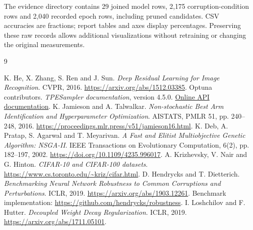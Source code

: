 \documentclass[11pt,a4paper,oneside]{report}
\begin{document}
The evidence directory contains 29 joined model rows, 2,175 corruption-condition rows and 2,040 recorded epoch rows, including pruned candidates. CSV accuracies are fractions; report tables and axes display percentages. Preserving these raw records allows additional visualizations without retraining or changing the original measurements.
\clearpage
\begin{thebibliography}{9}
{}
 K. He, X. Zhang, S. Ren and J. Sun. \emph{Deep Residual Learning for Image Recognition}. CVPR, 2016. \url{https://arxiv.org/abs/1512.03385}.
 Optuna contributors. \emph{TPESampler documentation}, version 4.5.0. \href{https://optuna.readthedocs.io/en/v4.5.0/reference/samplers/generated/optuna.samplers.TPESampler.html}{Online API documentation}.
 K. Jamieson and A. Talwalkar. \emph{Non-stochastic Best Arm Identification and Hyperparameter Optimization}. AISTATS, PMLR 51, pp. 240--248, 2016. \url{https://proceedings.mlr.press/v51/jamieson16.html}.
 K. Deb, A. Pratap, S. Agarwal and T. Meyarivan. \emph{A Fast and Elitist Multiobjective Genetic Algorithm: NSGA-II}. IEEE Transactions on Evolutionary Computation, 6(2), pp. 182--197, 2002. \url{https://doi.org/10.1109/4235.996017}.
 A. Krizhevsky, V. Nair and G. Hinton. \emph{CIFAR-10 and CIFAR-100 datasets}. \url{https://www.cs.toronto.edu/~kriz/cifar.html}.
 D. Hendrycks and T. Dietterich. \emph{Benchmarking Neural Network Robustness to Common Corruptions and Perturbations}. ICLR, 2019. \url{https://arxiv.org/abs/1903.12261}. Benchmark implementation: \url{https://github.com/hendrycks/robustness}.
 I. Loshchilov and F. Hutter. \emph{Decoupled Weight Decay Regularization}. ICLR, 2019. \url{https://arxiv.org/abs/1711.05101}.
\end{thebibliography}
\end{document}
